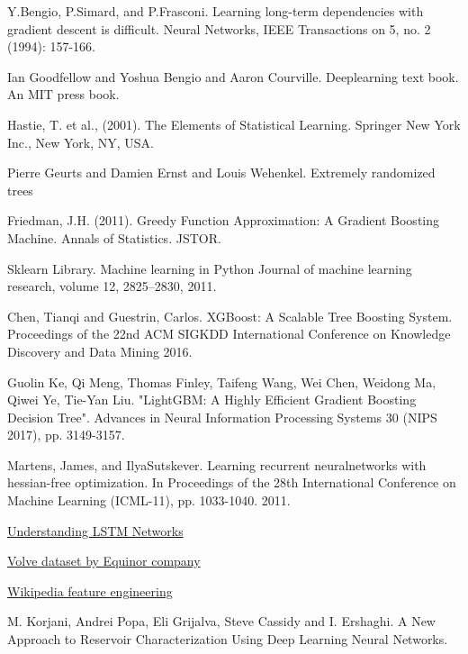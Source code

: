 \documentclass[english]{article}
\begin{document}
\begin{thebibliography}{1}
Y.Bengio, P.Simard, and P.Frasconi.
\newblock Learning long-term dependencies with gradient descent is difficult.
\newblock Neural Networks, IEEE Transactions on 5, no. 2 (1994): 157-166.


Ian Goodfellow and Yoshua Bengio and Aaron Courville.
\newblock Deeplearning text book.
\newblock An MIT press book.

Hastie, T. et al., (2001).
\newblock The Elements of Statistical Learning. Springer New York Inc., New York, NY, USA.

Pierre Geurts and Damien Ernst and Louis Wehenkel.
\newblock Extremely randomized trees

Friedman, J.H. (2011). 
\newblock Greedy Function Approximation: A Gradient Boosting Machine. Annals of Statistics. JSTOR.

Sklearn Library.
\newblock Machine learning in Python
\newblock Journal of machine learning research, volume 12, 2825--2830, 2011.

Chen, Tianqi and Guestrin, Carlos.
\newblock XGBoost: A Scalable Tree Boosting System.
\newblock Proceedings of the 22nd ACM SIGKDD International Conference on Knowledge Discovery and Data Mining 2016.

Guolin Ke, Qi Meng, Thomas Finley, Taifeng Wang, Wei Chen, Weidong Ma, Qiwei Ye, Tie-Yan Liu. \newblock "LightGBM: A Highly Efficient Gradient Boosting Decision Tree". 
\newblock Advances in Neural Information Processing Systems 30 (NIPS 2017), pp. 3149-3157.

Martens, James, and IlyaSutskever.
\newblock Learning recurrent neuralnetworks with hessian-free optimization.
\newblock In Proceedings of the 28th International Conference on Machine Learning (ICML-11), pp. 1033-1040. 2011.

\href{https://colah.github.io/posts/2015-08-Understanding-LSTMs/}{Understanding LSTM Networks}

\href{https://www.equinor.com/en/news/14jun2018-disclosing-volve-data.html}{Volve dataset by Equinor company}

\href{https://en.wikipedia.org/wiki/Feature_engineering}{Wikipedia feature engineering}

M. Korjani, Andrei Popa, Eli Grijalva, Steve Cassidy and I. Ershaghi.
\newblock A New Approach to Reservoir Characterization Using Deep Learning Neural Networks.


\end{thebibliography}
\end{document}
